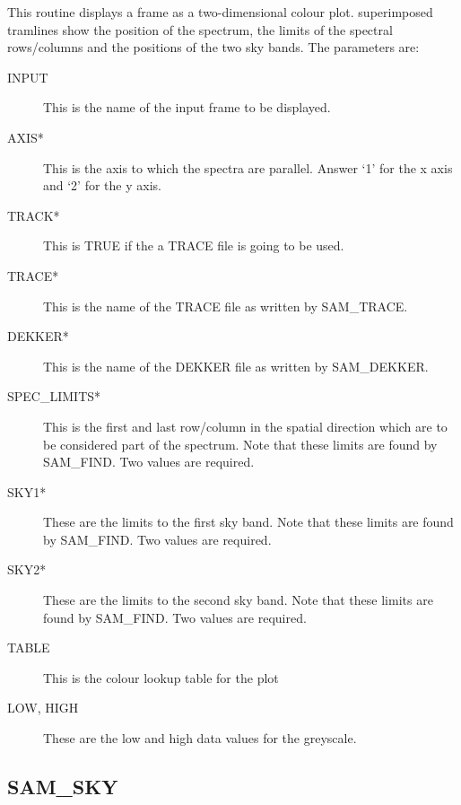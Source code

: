This routine displays a frame as a two-dimensional colour plot. superimposed
tramlines show the position of the spectrum, the limits of the spectral
rows/columns and the positions of the two sky bands.  The parameters are:

\begin{description}
\begin{description}

\item[INPUT] This is the name of the input frame to be displayed.

\item[AXIS*] This is the axis to which the spectra are parallel.  Answer `1'
for the x axis and `2' for the y axis.

\item[TRACK*] This is TRUE if the a TRACE file is going to be used.

\item[TRACE*] This is the name of the TRACE file as written by SAM\_TRACE.

\item[DEKKER*] This is the name of the DEKKER file as written by SAM\_DEKKER.

\item[SPEC\_LIMITS*] This is the first and last row/column in the spatial
direction which are to be considered part of the spectrum.  Note that these
limits are found by SAM\_FIND. Two values are required.

\item[SKY1*] These are the limits to the first sky band.  Note that these
limits are found by SAM\_FIND.  Two values are required.

\item[SKY2*] These are the limits to the second sky band.  Note that these
limits are found by SAM\_FIND.  Two values are required.

\item[TABLE] This is the colour lookup table for the plot

\item[LOW, HIGH] These are the low and high data values for the greyscale.

\end{description}
\end{description}

\subsection{SAM\_SKY}

